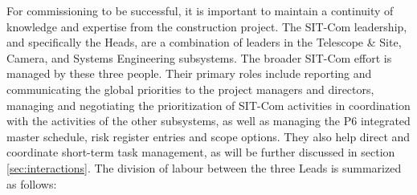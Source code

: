 \documentclass[SE,lsstdraft,authoryear,toc]{lsstdoc}
\begin{document}
For commissioning to be successful, it is important to maintain a continuity of knowledge and expertise from the construction project.
The SIT-Com leadership, and specifically the Heads, are a combination of leaders in the Telescope \& Site, Camera, and Systems Engineering subsystems.
The broader SIT-Com effort is managed by these three people.
Their primary roles include reporting and communicating the global priorities to the project managers and directors, managing and negotiating the prioritization of SIT-Com activities in coordination with the activities of the other subsystems, as well as managing the P6 integrated master schedule, risk register entries and scope options.
They also help direct and coordinate short-term task management, as will be further discussed in section \ref{sec:interactions}.
The division of labour between the three Leads is summarized as follows:
\end{document}
